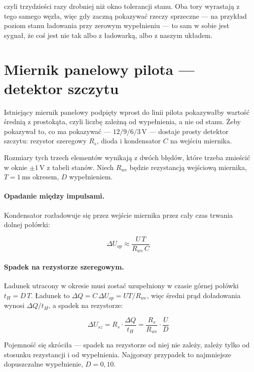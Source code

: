 \documentclass[a4paper,11pt]{article}
\newcommand{\volt}{\,\mathrm{V}}
\newcommand{\ms}{\,\mathrm{ms}}
\begin{document}
czyli trzydzieści razy drobniej niż okno tolerancji stanu. Oba tory wyrastają
z tego samego węzła, więc gdy zaczną pokazywać rzeczy sprzeczne --- na przykład
poziom stanu ładowania przy zerowym wypełnieniu --- to sam w sobie jest sygnał,
że coś jest nie tak albo z ładowarką, albo z naszym układem.

\section{Miernik panelowy pilota --- detektor szczytu}
\label{sec:szczyt}

Istniejący miernik panelowy podpięty wprost do linii pilota pokazywałby wartość
średnią z prostokąta, czyli liczbę zależną od wypełnienia, a nie od stanu. Żeby
pokazywał to, co ma pokazywać --- $12/9/6/3\volt$ --- dostaje prosty detektor
szczytu: rezystor szeregowy $R_s$, dioda i kondensator $C$ na wejściu miernika.

Rozmiary tych trzech elementów wynikają z dwóch błędów, które trzeba zmieścić
w oknie $\pm1\volt$ z tabeli stanów. Niech $R_{we}$ będzie rezystancją wejściową
miernika, $T=1\ms$ okresem, $D$ wypełnieniem.

\paragraph{Opadanie między impulsami.} Kondensator rozładowuje się przez wejście
miernika przez cały czas trwania dolnej połówki:

\begin{equation}
\Delta U_{op}\approx\frac{U\,T}{R_{we}\,C}
\label{eq:opadanie}
\end{equation}

\paragraph{Spadek na rezystorze szeregowym.} Ładunek utracony w okresie musi zostać
uzupełniony w czasie górnej połówki $t_H = D\,T$. Ładunek to
$\Delta Q = C\,\Delta U_{op} = U T/R_{we}$, więc średni prąd doładowania wynosi
$\Delta Q/t_H$, a spadek na rezystorze:

\begin{equation}
\Delta U_{sz}=R_s\cdot\frac{\Delta Q}{t_H}=\frac{R_s}{R_{we}}\cdot\frac{U}{D}
\label{eq:szereg}
\end{equation}

Pojemność się skróciła --- spadek na rezystorze od niej nie zależy, zależy tylko od
stosunku rezystancji i od wypełnienia. Najgorszy przypadek to najmniejsze
dopuszczalne wypełnienie, $D=0{,}10$.
\end{document}
